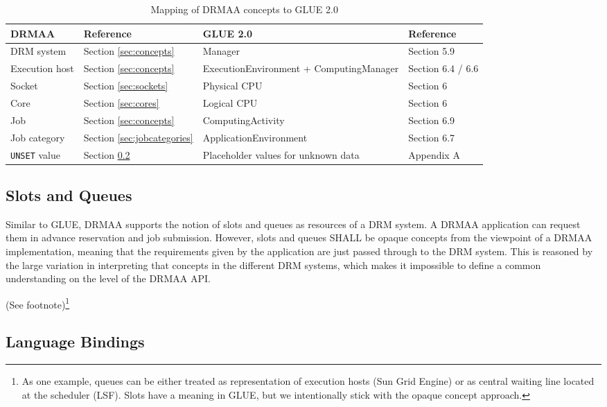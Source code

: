 \documentclass{article}
\newcommand{\h}[1]{\lstinline|#1|}
\newcommand{\rat}[1]{ {\tiny(See footnote)}\footnote{#1} }
\begin{document}
\begin{table}[ht]
\centering
\begin{tabularx}{\textwidth}{|X|X|l|X|}
\hline
DRMAA & Reference & GLUE 2.0  & Reference \cite{gfd.147} \\
\hline
DRM system & Section \ref{sec:concepts} & Manager & Section 5.9 \\
Execution host & Section \ref{sec:concepts} & ExecutionEnvironment + ComputingManager & Section 6.4 / 6.6 \\
Socket & Section \ref{sec:sockets} & Physical CPU & Section 6 \\
Core & Section \ref{sec:cores} & Logical CPU & Section 6 \\
Job & Section \ref{sec:concepts} & ComputingActivity & Section 6.9 \\
Job category & Section \ref{sec:jobcategories} & ApplicationEnvironment & Section 6.7 \\
\h{UNSET} value	& Section \ref{sec:langbind} & Placeholder values for unknown data & Appendix A \\
\hline
\end{tabularx}
\caption{Mapping of DRMAA concepts to GLUE 2.0}
\label{tab:gluemapping}
\end{table}

\subsection{Slots and Queues}
\label{sec:slotsandqueues}

Similar to GLUE, DRMAA supports the notion of slots and queues as resources of a DRM system. A DRMAA application can request them in advance reservation and job submission. However, slots and queues SHALL be opaque concepts from the viewpoint of a DRMAA implementation, meaning that the requirements given by the application are just passed through to the DRM system. This is reasoned by the large variation in interpreting that concepts in the different DRM systems, which makes it impossible to define a common understanding on the level of the DRMAA API.

\rat{
As one example, queues can be either treated as representation of execution hosts (Sun Grid Engine) or as central waiting line located at the scheduler (LSF).  Slots have a meaning in GLUE, but we intentionally stick with the opaque concept approach.
}

\subsection{Language Bindings}
\label{sec:langbind}
\end{document}
